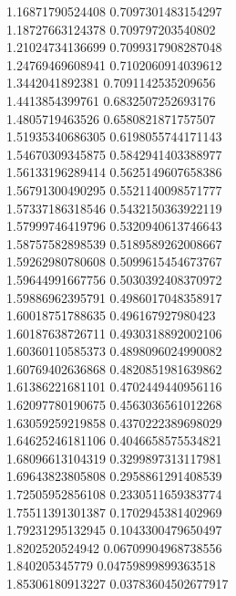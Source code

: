 {1.16871790524408 0.7097301483154297 \\
1.18727663124378 0.709797203540802 \\
1.21024734136699 0.7099317908287048 \\
1.24769469608941 0.7102060914039612 \\
1.3442041892381 0.7091142535209656 \\
1.4413854399761 0.6832507252693176 \\
1.4805719463526 0.6580821871757507 \\
1.51935340686305 0.6198055744171143 \\
1.54670309345875 0.5842941403388977 \\
1.56133196289414 0.5625149607658386 \\
1.56791300490295 0.5521140098571777 \\
1.57337186318546 0.5432150363922119 \\
1.57999746419796 0.5320940613746643 \\
1.58757582898539 0.5189589262008667 \\
1.59262980780608 0.5099615454673767 \\
1.59644991667756 0.5030392408370972 \\
1.59886962395791 0.4986017048358917 \\
1.60018751788635 0.496167927980423 \\
1.60187638726711 0.4930318892002106 \\
1.60360110585373 0.4898096024990082 \\
1.60769402636868 0.4820851981639862 \\
1.61386221681101 0.4702449440956116 \\
1.62097780190675 0.4563036561012268 \\
1.63059259219858 0.4370222389698029 \\
1.64625246181106 0.4046658575534821 \\
1.68096613104319 0.3299897313117981 \\
1.69643823805808 0.2958861291408539 \\
1.72505952856108 0.2330511659383774 \\
1.75511391301387 0.1702945381402969 \\
1.79231295132945 0.1043300479650497 \\
1.8202520524942 0.06709904968738556 \\
1.840205345779 0.04759899899363518 \\
1.85306180913227 0.03783604502677917 \\
}
